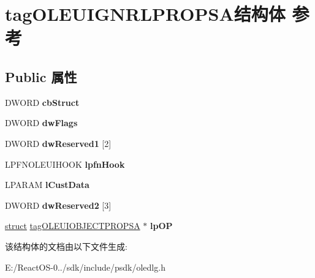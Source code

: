 \hypertarget{structtag_o_l_e_u_i_g_n_r_l_p_r_o_p_s_a}{}\section{tag\+O\+L\+E\+U\+I\+G\+N\+R\+L\+P\+R\+O\+P\+S\+A结构体 参考}
\label{structtag_o_l_e_u_i_g_n_r_l_p_r_o_p_s_a}
\subsection*{Public 属性}
\begin{DoxyCompactItemize}
\item 
\mbox{\label{structtag_o_l_e_u_i_g_n_r_l_p_r_o_p_s_a_a05428c161f99ccc5806c2690121f811f}} 
D\+W\+O\+RD {\bfseries cb\+Struct}
\item 
\mbox{\label{structtag_o_l_e_u_i_g_n_r_l_p_r_o_p_s_a_aa719f4f2220c7bacf8326375e98e704b}} 
D\+W\+O\+RD {\bfseries dw\+Flags}
\item 
\mbox{\label{structtag_o_l_e_u_i_g_n_r_l_p_r_o_p_s_a_a2d97c75ddb922f05f0e5ed90972c3543}} 
D\+W\+O\+RD {\bfseries dw\+Reserved1} \mbox{[}2\mbox{]}
\item 
\mbox{\label{structtag_o_l_e_u_i_g_n_r_l_p_r_o_p_s_a_ae509f27d7fcbf0a2febb01a1ad38cb65}} 
L\+P\+F\+N\+O\+L\+E\+U\+I\+H\+O\+OK {\bfseries lpfn\+Hook}
\item 
\mbox{\label{structtag_o_l_e_u_i_g_n_r_l_p_r_o_p_s_a_aa7d12f293e391053ddb9f87d399551dc}} 
L\+P\+A\+R\+AM {\bfseries l\+Cust\+Data}
\item 
\mbox{\label{structtag_o_l_e_u_i_g_n_r_l_p_r_o_p_s_a_a841e0610c3d9e6fbbba49fa2c478794c}} 
D\+W\+O\+RD {\bfseries dw\+Reserved2} \mbox{[}3\mbox{]}
\item 
\mbox{\label{structtag_o_l_e_u_i_g_n_r_l_p_r_o_p_s_a_aa84fe2103e712dded2436d51a052060f}} 
\hyperlink{interfacestruct}{struct} \hyperlink{structtag_o_l_e_u_i_o_b_j_e_c_t_p_r_o_p_s_a}{tag\+O\+L\+E\+U\+I\+O\+B\+J\+E\+C\+T\+P\+R\+O\+P\+SA} $\ast$ {\bfseries lp\+OP}
\end{DoxyCompactItemize}


该结构体的文档由以下文件生成\+:\begin{DoxyCompactItemize}
\item 
E\+:/\+React\+O\+S-\/0../sdk/include/psdk/oledlg.\+h\end{DoxyCompactItemize}

